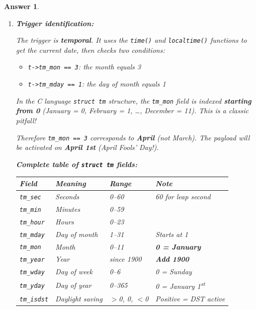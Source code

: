 \documentclass[a4paper,11pt]{article}
\theoremstyle{plain}
\newtheorem{correction}{Answer}
\theoremstyle{definition}
\begin{document}
\begin{correction}

\begin{enumerate}
\item \textbf{Trigger identification:}

The trigger is \textbf{temporal}. It uses the \texttt{time()} and \texttt{localtime()} functions to get the current date, then checks two conditions:
\begin{itemize}
\item \texttt{t->tm\_mon == 3}: the month equals 3
\item \texttt{t->tm\_mday == 1}: the day of month equals 1
\end{itemize}

\begin{attention}
In the C language \texttt{struct tm} structure, the \texttt{tm\_mon} field is indexed \textbf{starting from 0} (January = 0, February = 1, \ldots, December = 11). This is a classic pitfall!

Therefore \texttt{tm\_mon == 3} corresponds to \textbf{April} (not March). The payload will be activated on \textbf{April 1st} (April Fools' Day!).
\end{attention}

\textbf{Complete table of \texttt{struct tm} fields:}

\medskip
\begin{center}
\begin{tabular}{llll}
\toprule
\textbf{Field} & \textbf{Meaning} & \textbf{Range} & \textbf{Note} \\
\midrule
\texttt{tm\_sec}   & Seconds          & 0--60  & 60 for leap second \\
\texttt{tm\_min}   & Minutes          & 0--59  & \\
\texttt{tm\_hour}  & Hours            & 0--23  & \\
\texttt{tm\_mday}  & Day of month     & 1--31  & Starts at 1 \\
\texttt{tm\_mon}   & Month            & 0--11  & \textbf{0 = January} \\
\texttt{tm\_year}  & Year             & since 1900 & \textbf{Add 1900} \\
\texttt{tm\_wday}  & Day of week      & 0--6   & 0 = Sunday \\
\texttt{tm\_yday}  & Day of year      & 0--365 & 0 = January 1\textsuperscript{st} \\
\texttt{tm\_isdst} & Daylight saving  & $>$0, 0, $<$0 & Positive = DST active \\
\bottomrule
\end{tabular}
\end{center}


\end{enumerate}
\end{correction}
\end{document}
